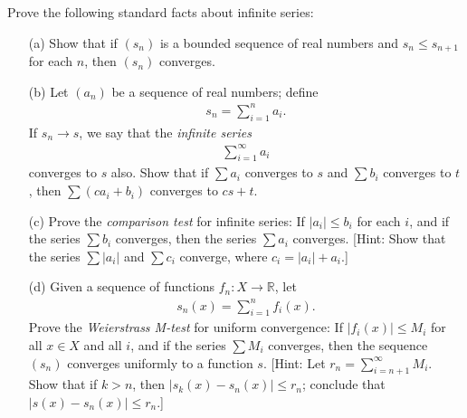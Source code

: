   \begin{exercise}[Munkres 21.11]
    Prove the following standard facts about infinite series:
    \begin{enumerate} 
      \item[(a)] Show that if $(s_n)$ is a bounded sequence of real numbers and $s_n \leq s_{n+1}$ for each $n$, then $(s_n)$ converges.
      \item[(b)] Let $(a_n)$ be a sequence of real numbers; define
      \begin{align*}
        s_n = \sum_{i=1}^{n} a_i.
      \end{align*}
      If $s_n \to s$, we say that the \textit{infinite series}
      \begin{align*}
        \sum_{i=1}^{\infty} a_i
      \end{align*}
      converges to $s$ also. Show that if $\sum a_i$ converges to $s$ and $\sum b_i$ converges to $t$, then $\sum(ca_i + b_i)$ converges to $cs + t$.
      \item[(c)] Prove the \textit{comparison test} for infinite series: If $|a_i| \leq b_i$ for each $i$, and if the series $\sum b_i$ converges, then the series $\sum a_i$ converges. [Hint: Show that the series $\sum|a_i|$ and $\sum c_i$ converge, where $c_i = |a_i| + a_i$.]
      \item[(d)] Given a sequence of functions $f_n : X \to \mathbb{R}$, let
      \begin{align*}
        s_n(x) = \sum_{i=1}^{n} f_i(x).
      \end{align*}
      Prove the \textit{Weierstrass M-test} for uniform convergence: If $|f_i(x)| \leq M_i$ for all $x \in X$ and all $i$, and if the series $\sum M_i$ converges, then the sequence $(s_n)$ converges uniformly to a function $s$. [Hint: Let $r_n = \sum_{i=n+1}^{\infty} M_i$. Show that if $k > n$, then $|s_k(x) - s_n(x)| \leq r_n$; conclude that $|s(x) - s_n(x)| \leq r_n$.]
    \end{enumerate}
  \end{exercise}

